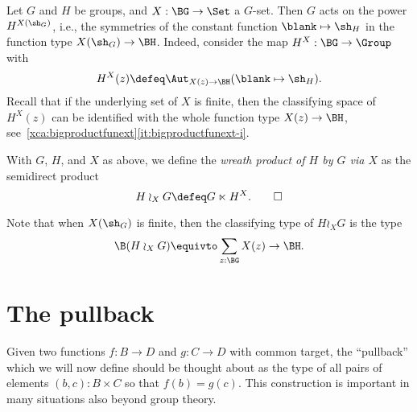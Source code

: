 Let $G$ and $H$ be groups, and $X : \BG \to \Set$ a $G$-set.  Then $G$ acts on the power $H^{X(\sh_G)}$, i.e., the symmetries of the constant
function $\blank \mapsto \sh_H$ in the function type $X(\sh_G) \to \BH$.
Indeed, consider the map $H^X : \BG \to \Group$ with
\[
  H^X(z) \defeq \Aut_{X(z) \to \BH}(\blank \mapsto \sh_H).
\]
Recall that if the underlying set of $X$ is finite,
then the classifying space of $H^X(z)$ can be identified with
the whole function type $X(z) \to \BH$,
see~\cref{xca:bigproductfunext}\ref{it:bigproductfunext-i}.
\begin{definition}
  With $G$, $H$, and $X$ as above, we define the \emph{wreath product of $H$ by $G$ via $X$} as the semidirect product
  \[
    H \wr_X G \defeq G \ltimes H^X.\qedhere
  \]
\end{definition}
Note that when $X(\sh_G)$ is finite, then
the classifying type of $H \wr_X G$ is the type
\[
  \B(H \wr_X G) \equivto \sum_{z:\BG}X(z) \to \BH.
\]

\begin{example}
  
\end{example}

\begin{example}[Sudoku]
  
\end{example}

\begin{example}
  
\end{example}

\section{The pullback}
\label{sec:pullback}
Given two functions $f:B\to D$ and $g:C\to D$ with common target, the ``pullback'' which we will now define should be thought about as the type of all pairs of elements $(b,c):B\times C$ so that $f(b)=g(c)$.  This construction is important in many situations also beyond group theory.

